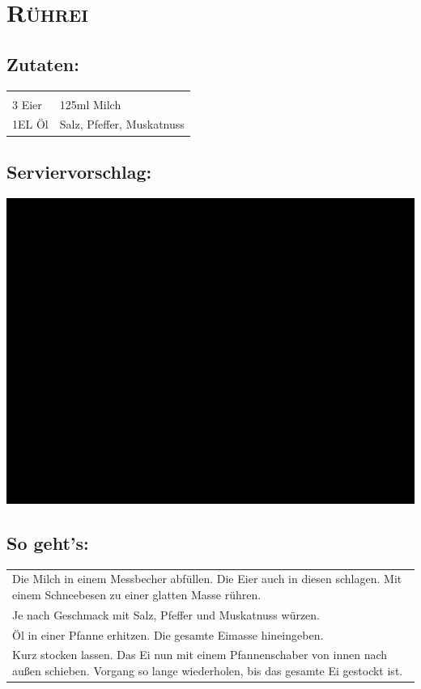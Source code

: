 \section{\textsc{Rührei}}

\subsection*{Zutaten:}

\begin{tabular}{p{7.5cm} p{7.5cm}}
	& \\
	3 Eier & 125ml Milch \\
	1EL Öl & Salz, Pfeffer, Muskatnuss
\end{tabular}

\subsection*{Serviervorschlag:}

\includegraphics[width=\textwidth]{img/ph.jpg}

\subsection*{So geht's:}

\begin{tabular}{p{15cm}}
	\\
	Die Milch in einem Messbecher abfüllen. Die Eier auch in diesen schlagen. Mit einem Schneebesen zu einer glatten Masse rühren.\\
	Je nach Geschmack mit Salz, Pfeffer und Muskatnuss würzen.\\
	Öl in einer Pfanne erhitzen. Die gesamte Eimasse hineingeben.\\
	Kurz stocken lassen. Das Ei nun mit einem Pfannenschaber von innen nach außen schieben. Vorgang so lange wiederholen, bis das gesamte Ei gestockt ist.
\end{tabular}